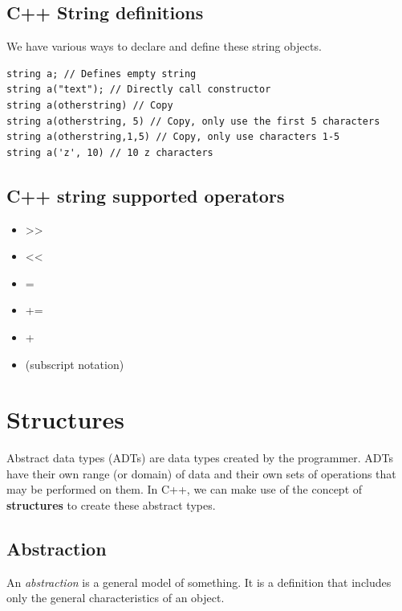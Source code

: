 \documentclass{report}
\begin{document}
    \bigbreak \noindent 
    \subsection{C++ String definitions}
    \bigbreak \noindent 
    We have various ways to declare and define these string objects.
    \bigbreak \noindent 
    \sepline
    \begin{verbatim}
string a; // Defines empty string
string a("text"); // Directly call constructor
string a(otherstring) // Copy
string a(otherstring, 5) // Copy, only use the first 5 characters
string a(otherstring,1,5) // Copy, only use characters 1-5
string a('z', 10) // 10 z characters
    \end{verbatim}
    \sepline

    \bigbreak \noindent 
    \subsection{C++ string supported operators}
    \bigbreak \noindent 
    \begin{itemize}
        \item >>
        \item <<
        \item =
        \item +=
        \item +
        \item [] (subscript notation)
    \end{itemize}

    \pagebreak \bigbreak \noindent 
    \section{\LARGE Structures}
    \bigbreak \noindent 
    \begin{concept}
        Abstract data types (ADTs) are data types created by the programmer. ADTs have their own range (or domain) of data and their own sets of operations that may be performed on them. In C++, we can make use of the concept of \textbf{structures} to create these abstract types. 
	\end{concept}

	\bigbreak \noindent 
	\subsection{Abstraction}
	\bigbreak \noindent 
	An \textit{abstraction} is a general model  of something. It is a definition that includes only the general characteristics of an object.
\end{document}
